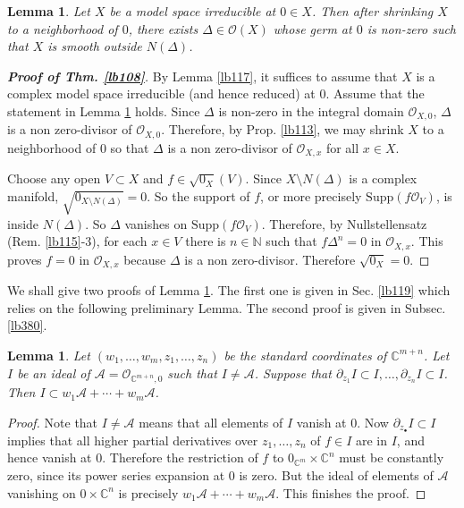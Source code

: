 \documentclass[12pt,b5paper,notitlepage]{report}
\theoremstyle{definition}
\theoremstyle{plain}
\newtheorem{lm}[df]{Lemma}
\newcommand{\scr}{\mathscr}
\newcommand{\blt}{\bullet}
\newcommand{\Cbb}{\mathbb C}
\newcommand{\Nbb}{\mathbb N}
\newcommand{\Supp}{\mathrm{Supp}}
\numberwithin{equation}{section}
\begin{document}
\begin{lm}\label{lb112}
Let $X$ be a model space irreducible at $0\in X$. Then after shrinking $X$ to a neighborhood of $0$, there exists $\varDelta\in\scr O(X)$ whose germ at $0$ is non-zero such that $X$ is smooth outside $N(\varDelta)$. 
\end{lm}








\begin{proof}[\textbf{Proof of Thm. \ref{lb108}}]
By Lemma \ref{lb117}, it suffices to assume that $X$ is a complex model space irreducible (and hence reduced) at $0$.  Assume that the statement in Lemma \ref{lb112} holds. Since $\varDelta$ is non-zero in the integral domain $\scr O_{X,0}$, $\varDelta$ is a non zero-divisor of $\scr O_{X,0}$. Therefore, by Prop. \ref{lb113}, we may shrink $X$ to a neighborhood of $0$ so that $\varDelta$ is a non zero-divisor of $\scr O_{X,x}$ for all $x\in X$.

Choose any open $V\subset X$ and $f\in\sqrt{0_X}(V)$. Since $X\setminus N(\varDelta)$ is a complex manifold, $\sqrt{0_{X\setminus N(\varDelta)}}=0$. So the support of $f$, or more precisely $\Supp(f\scr O_V)$, is inside $N(\varDelta)$. So $\varDelta$ vanishes on $\Supp(f\scr O_V)$. Therefore, by Nullstellensatz (Rem. \ref{lb115}-3), for each $x\in V$ there is $n\in\Nbb$ such that $f\varDelta^n=0$ in $\scr O_{X,x}$. This proves $f=0$ in $\scr O_{X,x}$ because $\varDelta$ is a non zero-divisor. Therefore $\sqrt{0_X}=0$.
\end{proof}







We shall give two proofs of Lemma \ref{lb112}. The first one is given in Sec. \ref{lb119} which relies on the following preliminary Lemma. The second proof is given in Subsec. \ref{lb380}.



\begin{lm}\label{lb111}
Let $(w_1,\dots,w_m,z_1,\dots,z_n)$ be the standard coordinates of $\Cbb^{m+n}$. Let $I$ be an ideal of $\scr A=\scr O_{\Cbb^{m+n},0}$ such that $I\neq\scr A$. Suppose that $\partial_{z_1}I\subset I,\dots,\partial_{z_n}I\subset I$. Then $I\subset w_1\scr A+\cdots+w_m\scr A$.
\end{lm}


\begin{proof}
Note that $I\neq\scr A$ means that all elements of $I$ vanish at $0$. Now $\partial_{z_\blt}I\subset I$ implies that all higher partial derivatives over $z_1,\dots,z_n$ of $f\in I$ are in $I$, and hence vanish at $0$. Therefore the restriction of $f$ to $0_{\Cbb^m}\times\Cbb^n$ must be constantly zero, since its power series expansion at $0$ is zero. But the ideal of elements of $\scr A$ vanishing on $0\times\Cbb^n$ is precisely $w_1\scr A+\cdots+w_m\scr A$. This finishes the proof.
\end{proof}
\end{document}
